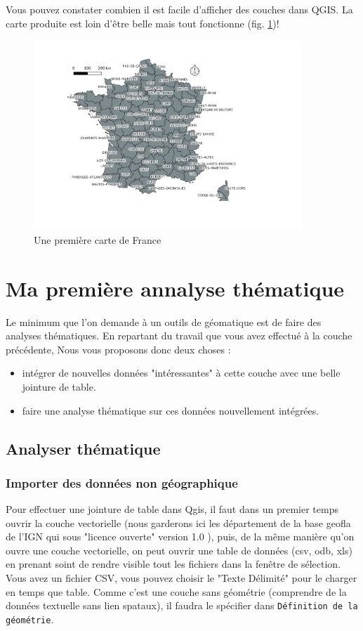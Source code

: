\documentclass[a4paper, 11pt]{article}
\begin{document}
Vous pouvez constater combien il est facile d’afficher des couches dans QGIS. La carte produite est loin d'être belle mais tout fonctionne (fig. \ref{fig:carte1})!

\begin{figure}
\centering
  \includegraphics[width=0.9\textwidth]{img/carte_france1}
  \caption{Une première carte de France}\label{fig:carte1}
\end{figure}

\section{Ma première annalyse thématique}
Le minimum que l'on demande à un outils de géomatique est de faire des analyses thématiques. En repartant du travail que vous avez effectué à la couche précédente, Nous vous proposons donc deux choses :
  \begin{itemize}
    \item intégrer de nouvelles données "intéressantes" à cette couche avec une belle jointure de table.
    \item faire une analyse thématique sur ces données nouvellement intégrées.
  \end{itemize}

  \subsection{Analyser thématique}
  \subsubsection{Importer des données non géographique}\label{part:chargerData}
  Pour effectuer une jointure de table dans Qgis, il faut dans un premier temps ouvrir la couche vectorielle (nous garderons ici les département de la base geofla de l'IGN qui sous "licence ouverte" version 1.0 ), puis, de la même manière qu'on ouvre une couche vectorielle, on peut ouvrir une table de données (csv, odb, xls) en prenant soint de rendre visible tout les fichiers dans la fenêtre de sélection. Vous avez un fichier CSV, vous pouvez choisir le "Texte Délimité" pour le charger en temps que table. Comme c'est une couche sans géométrie (comprendre de la données textuelle sans lien spataux), il faudra le spécifier dans \texttt{Définition de la géométrie}.
\end{document}
